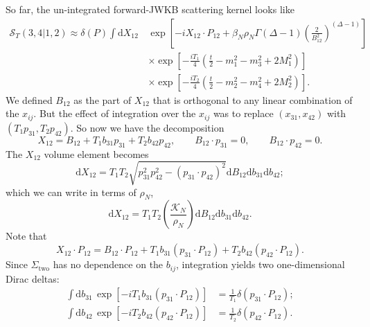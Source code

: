 So far, the un-integrated forward-JWKB scattering kernel looks like
\begin{equation}
\begin{split}
	\mathcal{S}_{T}(3,4|1,2) \approx \delta(P) \int \mathrm{d}X_{12} \, {}& \exp{\left[-i X_{12} \cdot P_{12} + \beta_{N} \rho_{N} \Gamma(\Delta - 1) \left( \frac{2}{B_{1 2}^{2}} \right)^{(\Delta - 1)} \right]} \\
	&\times \exp{\left[ -\frac{i T_{1}}{4} \left( \frac{t}{2} -m_{1}^{2} - m_{3}^{2} + 2 M_{1}^{2} \right) \right]} \\
	&\times \exp{\left[ -\frac{i T_{2}}{4} \left( \frac{t}{2} -m_{2}^{2} - m_{4}^{2} + 2 M_{2}^{2} \right) \right]}.
\end{split}
\label{STTX12}
\end{equation}
We defined $B_{12}$ as the part of $X_{12}$ that is orthogonal to any linear combination of the $x_{ij}$. But the effect of integration over the $x_{ij}$ was to replace $(x_{31}, x_{42})$ with $(T_{1} p_{31}, T_{2} p_{42})$. So now we have the decomposition
\begin{equation}
	X_{12} = B_{12} + T_{1} b_{31} p_{31} + T_{2} b_{42} p_{42}, \qquad B_{12} \cdot p_{31} = 0, \qquad B_{12} \cdot p_{42} = 0.
\end{equation}
The $X_{12}$ volume element becomes
\begin{equation}
	\mathrm{d}X_{12} = T_{1} T_{2} \sqrt{p_{31}^{2} p_{42}^{2} - (p_{31} \cdot p_{42})^{2}} \mathrm{d}B_{12} \mathrm{d}b_{31} \mathrm{d}b_{42};
\end{equation}
which we can write in terms of $\rho_{N}$,
\begin{equation}
	\mathrm{d}X_{12} = T_{1} T_{2} \left( \frac{\mathcal{K}_{N}}{\rho_{N}} \right) \mathrm{d}B_{12} \mathrm{d}b_{31} \mathrm{d}b_{42}.
\end{equation}
Note that
\begin{equation}
	X_{12} \cdot P_{12} = B_{12} \cdot P_{12} + T_{1} b_{31} (p_{31} \cdot P_{12}) + T_{2} b_{42} (p_{42} \cdot P_{12}).
\end{equation}
Since $\Sigma_{\text{two}}$ has no dependence on the $b_{ij}$, integration yields two one-dimensional Dirac deltas:
\begin{align}
	\int \mathrm{d}b_{31} \, \exp{\left[- i T_{1} b_{31} (p_{31} \cdot P_{12}) \right]} &= \frac{1}{T_{1}} \delta(p_{31} \cdot P_{12}); \\
	\int \mathrm{d}b_{42} \, \exp{\left[- i T_{2} b_{42} (p_{42} \cdot P_{12}) \right]} &= \frac{1}{T_{2}} \delta(p_{42} \cdot P_{12}).
\end{align}

